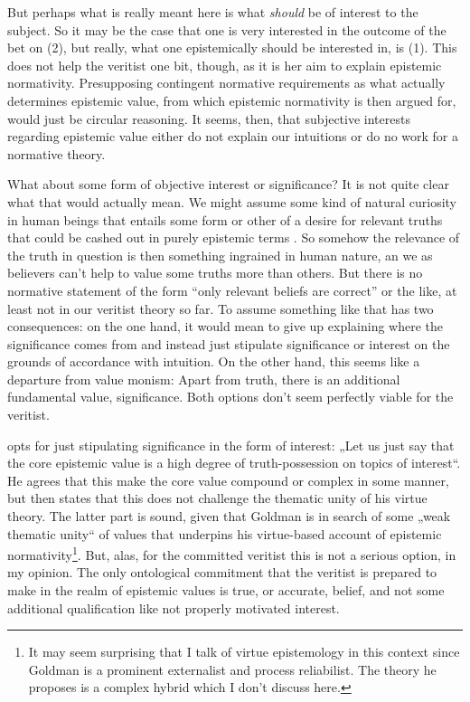 \documentclass[12pt,numbers=noenddot]{scrartcl}
\begin{document}
But perhaps what is really meant here is what \emph{should} be of interest to the subject. So it may be the case that one is very interested in the outcome of the bet on (2), but really, what one epistemically should be interested in, is (1). This does not help the veritist one bit, though, as it is her aim to explain epistemic normativity. Presupposing contingent normative requirements as what actually determines epistemic value, from which epistemic normativity is then argued for, would just be circular reasoning. It seems, then, that subjective interests regarding epistemic value either do not explain our intuitions or do no work for a normative theory.

What about some form of objective interest or significance? It is not quite clear what that would actually mean. We might assume some kind of natural curiosity in human beings that entails some form or other of a desire for relevant truths that could be cashed out in purely epistemic terms \autocite[333]{Ahlstrom-Vij2013}. So somehow the relevance of the truth in question is then something ingrained in human nature, an we as believers can't help to value some truths more than others. But there is no normative statement of the form “only relevant beliefs are correct” or the like, at least not in our veritist theory so far. To assume something like that has two consequences: on the one hand, it would mean to give up explaining where the significance comes from and instead just stipulate significance or interest on the grounds of accordance with intuition. On the other hand, this seems like a departure from value monism: Apart from truth, there is an additional fundamental value, significance. Both options don't seem perfectly viable for the veritist.

\textcite[61]{Goldman2002-GOLTUO-2} opts for just stipulating significance in the form of interest: „Let us just say that the core epistemic value is a high degree of truth-possession on topics of interest“. He agrees that this make the core value compound or complex in some manner, but then states that this does not challenge the thematic unity of his virtue theory. The latter part is sound, given that Goldman is in search of some „weak thematic unity“ of values that underpins his virtue-based account of epistemic normativity\footnote{It may seem surprising that I talk of virtue epistemology in this context since Goldman is a prominent externalist and process reliabilist. The theory he proposes is a complex hybrid which I don't discuss here.}. But, alas, for the committed veritist this is not a serious option, in my opinion. The only ontological commitment that the veritist is prepared to make in the realm of epistemic values is true, or accurate, belief, and not some additional qualification like not properly motivated interest.
\end{document}
